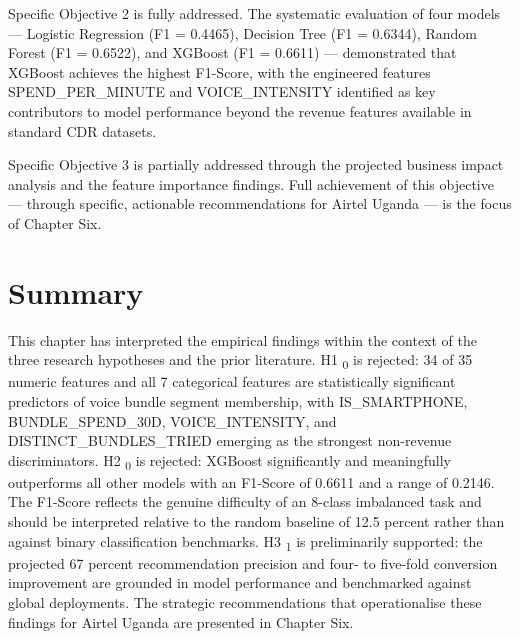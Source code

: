 Specific Objective 2 is fully addressed. The systematic evaluation of four models --- Logistic Regression (F1 = 0.4465), Decision Tree (F1 = 0.6344), Random Forest (F1 = 0.6522), and XGBoost (F1 = 0.6611) --- demonstrated that XGBoost achieves the highest F1-Score, with the engineered features SPEND\_PER\_MINUTE and VOICE\_INTENSITY identified as key contributors to model performance beyond the revenue features available in standard CDR datasets.

Specific Objective 3 is partially addressed through the projected business impact analysis and the feature importance findings. Full achievement of this objective --- through specific, actionable recommendations for Airtel Uganda --- is the focus of Chapter Six.


\section{Summary}

This chapter has interpreted the empirical findings within the context of the three research hypotheses and the prior literature. H1	\textsubscript{0} is rejected: 34 of 35 numeric features and all 7 categorical features are statistically significant predictors of voice bundle segment membership, with IS\_SMARTPHONE, BUNDLE\_SPEND\_30D, VOICE\_INTENSITY, and DISTINCT\_BUNDLES\_TRIED emerging as the strongest non-revenue discriminators. H2	\textsubscript{0} is rejected: XGBoost significantly and meaningfully outperforms all other models with an F1-Score of 0.6611 and a range of 0.2146. The F1-Score reflects the genuine difficulty of an 8-class imbalanced task and should be interpreted relative to the random baseline of 12.5 percent rather than against binary classification benchmarks. H3	\textsubscript{1} is preliminarily supported: the projected 67 percent recommendation precision and four- to five-fold conversion improvement are grounded in model performance and benchmarked against global deployments. The strategic recommendations that operationalise these findings for Airtel Uganda are presented in Chapter Six.

